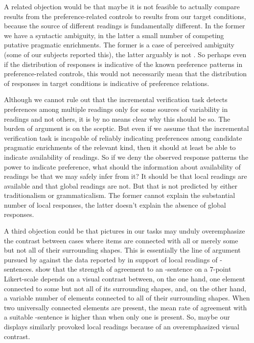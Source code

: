 \documentclass[fleqn,reqno,10pt,draft]{article}
\renewcommand{\es}{\acro{es}}
\begin{document}
A related objection would be that maybe it is not feasible to actually
compare results from the preference-related controls to results from
our target conditions, because the source of different readings is
fundamentally different. In the former we have a syntactic ambiguity,
in the latter a small number of competing putative pragmatic
enrichments. The former is a case of perceived ambiguity (some of our
subjects reported this), the latter arguably is not
\citep[c.f.][]{GeurtsPouscoulous2009:Embedded-Implic}. So perhaps even
if the distribution of responses is indicative of the known preference
patterns in preference-related controls, this would not necessarily
mean that the distribution of responses in target conditions is
indicative of preference relations.

Although we cannot rule out that the incremental verification task
detects preferences among multiple readings only for some sources of
variability in readings and not others, it is by no means clear why
this should be so. The burden of argument is on the sceptic. But even
if we assume that the incremental verification task is incapable of
reliably indicating preferences among candidate pragmatic enrichments
of the relevant kind, then it should at least be able to indicate
availability of readings. So if we deny the observed response patterns
the power to indicate preference, what should the information about
availability of readings be that we may safely infer from it? It
should be that local readings are available and that global readings
are not. But that is not predicted by either traditionalism or
grammaticalism. The former cannot explain the substantial number of
local responses, the latter doesn't explain the absence of global
responses.

A third objection could be that pictures in our tasks may unduly
overemphasize the contrast between cases where items are connected
with all or merely some but not all of their surrounding shapes. This
is essentially the line of argument pursued by
\citet{GeurtsTielvan-Tiel2013:Scalar-expressi} against the data
reported by \citet{ChemlaSpector2010:Experimental-Ev} in support of
local readings of
\es-sentences. \citeauthor{GeurtsTielvan-Tiel2013:Scalar-expressi}
show that the strength of agreement to an \es-sentence on a 7-point
Likert-scale depends on a visual contrast between, on the one hand,
one element connected to some but not all of its surrounding shapes,
and, on the other hand, a variable number of elements connected to all
of their surrounding shapes. When two universally connected elements
are present, the mean rate of agreement with a suitable \es-sentence
is higher than when only one is present. So, maybe our displays
similarly provoked local readings because of an overemphasized visual
contrast.
\end{document}
